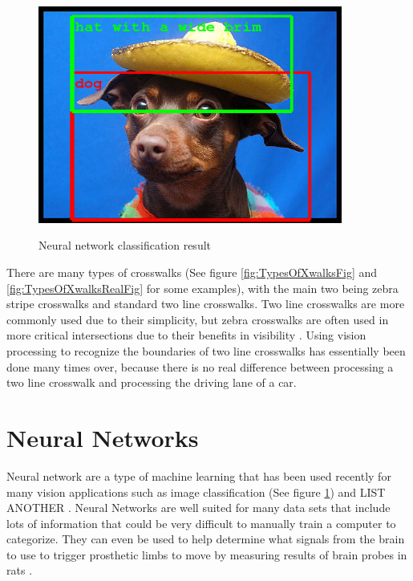 \documentclass[12pt]{ucthesis}
\newcommand{\captionfonts}{\small\bf\ssp}
\begin{document}
\begin{figure}
\begin{center}
\includegraphics[width=10cm]{DogWithHat.PNG}
\captionfonts
\caption[This is a figure]{Neural network classification result\cite{christianszegedy2014}}
\label{fig:DogWithHat}
\end{center}
\end{figure}

There are many types of crosswalks (See figure \ref{fig:TypesOfXwalksFig} and \ref{fig:TypesOfXwalksRealFig} for some examples), with the main two being zebra stripe crosswalks and standard two line crosswalks. Two line crosswalks are more commonly used due to their simplicity, but zebra crosswalks are often used in more critical intersections due to their benefits in visibility \cite{crosswalkTypeEvaluation}. Using vision processing to recognize the boundaries of two line crosswalks has essentially been done many times over, because there is no real difference between processing a two line crosswalk and processing the driving lane of a car.
\section{Neural Networks}
Neural network are a type of machine learning that has been used recently for many vision applications such as image classification (See figure \ref{fig:DogWithHat}) and LIST ANOTHER \cite{christianszegedy2014}. Neural Networks are well suited for many data sets that include lots of information that could be very difficult to manually train a computer to categorize. They can even be used to help determine what signals from the brain to use to trigger prosthetic limbs to move by measuring results of brain probes in rats \cite{ratNeural}.

\end{document}
